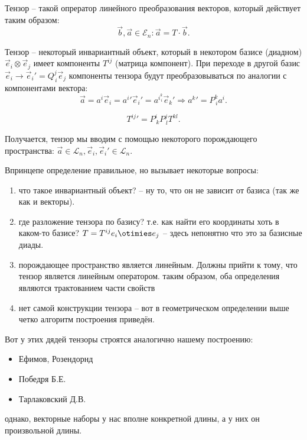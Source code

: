 \begin{definition}
  Тензор -- такой опрератор линейного преобразования векторов, который действует таким образом:
  \[
    \vec{b}, \vec{a} \in \mathcal{E}_n : \vec{a} = T \cdot \vec{b}.
  \]
\end{definition}

\begin{definition}
  Тензор -- некоторый инвариантный объект, который в некотором базисе (диадном) $\vec{e}_i \otimes \vec{e}_j$ имеет компоненты $T^{ij}$ (матрица компонент).
  При переходе в другой базис $\vec{e}_i \to \vec{e}_i' = Q^j_{\, i} \vec{e}_j$ компоненты тензора
  будут преобразовываться по аналогии с компонентами вектора:
  \[
    \vec{a} = a^i \vec{e}_i = a^i' \vec{e}_i' = a^i ^k_{\,i} \vec{e}_k'
    \Rightarrow
    a^k' = P^k_{\, i} a^i.
  \]

  \[
    T^{ij}' = P^i_{\, k} P^j_{\, l} T^{kl}.
  \]

\end{definition}

Получается, тензор мы вводим с помощью некоторого порождающего пространства:
$\vec{a} \in \mathcal{L}_n, \vec{e}_i, \vec{e}_i' \in \mathcal{L}_n$.

Впринцепе определение правильное, но вызывает некоторые вопросы:
\begin{enumerate}
  \item что такое инвариантный объект? -- ну то, что он не зависит от базиса (так же как и векторы).

  \item где разложение тензора по базису? т.е. как найти его координаты хоть в каком-то базисе? 
    $T = T^{ij} e_i \otimies e_j$ -- здесь непонятно что это за базисные диады.

  \item порождающее пространство является линейным. Должны прийти к тому, что тензор является
    линейным оператором. таким образом, оба определения являются трактованием части свойств

  \item нет самой конструкции тензора -- вот в геометрическом определении выше четко алгоритм 
    построения приведён.
\end{enumerate}

Вот у этих дядей тензоры строятся аналогично нашему построению:
\begin{itemize}
  \item Ефимов, Розендорнд
  \item Победря Б.Е.
  \item Тарлаковский Д.В.
\end{itemize}
однако, векторные наборы у нас вполне конкретной длины, а у них он произвольной длины.

